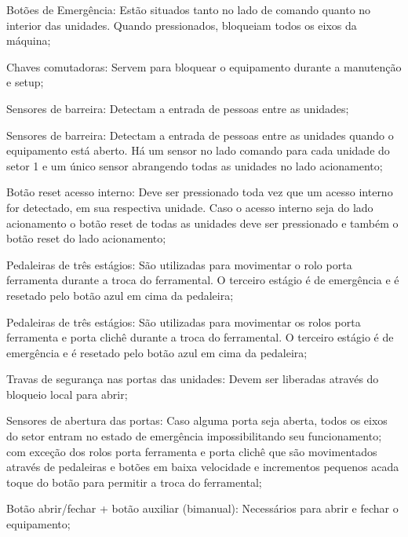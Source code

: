 \begin{safetyDevices}

  \item[\ding{\dingNumber}] Botões de Emergência: Estão situados \ifmachineType \else tanto \fi no lado de comando \ifmachineType \else quanto no interior das unidades\fi. Quando pressionados, bloqueiam todos os eixos da máquina;
  \item[\ding{\dingNumber}] Chaves comutadoras: Servem para bloquear o equipamento durante a manutenção e setup;
  \ifmachineType
  \item[\ding{\dingNumber}] Sensores de barreira: Detectam a entrada de pessoas entre as unidades;
  \else
  \item[\ding{\dingNumber}] Sensores de barreira: Detectam a entrada de pessoas entre as unidades quando o equipamento está aberto. Há um sensor no lado comando para cada 
  unidade do setor 1 e um único sensor abrangendo todas as unidades no lado acionamento;
  \fi
  \item[\ding{\dingNumber}] Botão reset acesso interno: Deve ser pressionado toda vez que um acesso interno for detectado, em sua respectiva unidade. Caso o acesso 
  interno seja do lado acionamento o botão reset de todas as unidades deve ser pressionado e também o botão reset do lado acionamento;
  \ifmachineType
  \item[\ding{\dingNumber}] Pedaleiras de três estágios: São utilizadas para movimentar o rolo porta ferramenta durante a troca do ferramental. O terceiro estágio é de
  emergência e é resetado pelo botão azul em cima da pedaleira;
  \else
  \item[\ding{\dingNumber}] Pedaleiras de três estágios: São utilizadas para movimentar os rolos porta ferramenta e porta clichê durante a troca do ferramental.
  O terceiro estágio é de emergência e é resetado pelo botão azul em cima da pedaleira;
  \fi
  \ifmachineType
  \item[\ding{\dingNumber}] Travas de segurança nas portas das unidades: Devem ser liberadas através do bloqueio local para abrir;
  \item[\ding{\dingNumber}] Sensores de abertura das portas: Caso alguma porta seja aberta, todos os eixos do setor entram no estado de emergência
  impossibilitando seu funcionamento; com exceção dos rolos porta ferramenta e porta clichê que são movimentados através de pedaleiras e botões em baixa velocidade
  e incrementos pequenos acada toque do botão para permitir a troca do ferramental;
  \else
  \item[\ding{\dingNumber}] Botão abrir/fechar + botão auxiliar (bimanual): Necessários para abrir e fechar o equipamento;

\end{safetyDevices}
